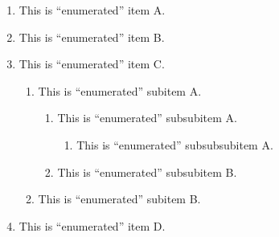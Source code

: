 \begin{enumerate}
  \item{} This is ``enumerated'' item A.
  \item{} This is ``enumerated'' item B.
  \item{} This is ``enumerated'' item C.
  \begin{enumerate}
    \item{} This is ``enumerated'' subitem A.
    \begin{enumerate}
      \item{} This is ``enumerated'' subsubitem A.
      \begin{enumerate}
        \item{} This is ``enumerated'' subsubsubitem A.
      \end{enumerate}
      \item{} This is ``enumerated'' subsubitem B.
    \end{enumerate}
    \item{} This is ``enumerated'' subitem B.
  \end{enumerate}
  \item{} This is ``enumerated'' item D.
\end{enumerate}

